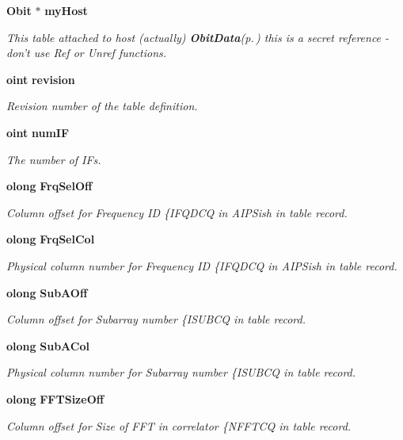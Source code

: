 \begin{CompactItemize}
{\bf Obit} $\ast$ {\bf my\-Host}
\begin{CompactList}\small\item\em This table attached to host (actually) {\bf Obit\-Data}{\rm (p.\,\pageref{structObitData})} this is a secret reference - don't use Ref or Unref functions. \item\end{CompactList}\item 
{\bf oint} {\bf revision}
\begin{CompactList}\small\item\em Revision number of the table definition. \item\end{CompactList}\item 
{\bf oint} {\bf num\-IF}
\begin{CompactList}\small\item\em The number of IFs. \item\end{CompactList}\item 
{\bf olong} {\bf Frq\-Sel\-Off}
\begin{CompactList}\small\item\em Column offset for Frequency ID \{IFQDCQ in AIPSish in table record. \item\end{CompactList}\item 
{\bf olong} {\bf Frq\-Sel\-Col}
\begin{CompactList}\small\item\em Physical column number for Frequency ID \{IFQDCQ in AIPSish in table record. \item\end{CompactList}\item 
{\bf olong} {\bf Sub\-AOff}
\begin{CompactList}\small\item\em Column offset for Subarray number \{ISUBCQ in table record. \item\end{CompactList}\item 
{\bf olong} {\bf Sub\-ACol}
\begin{CompactList}\small\item\em Physical column number for Subarray number \{ISUBCQ in table record. \item\end{CompactList}\item 
{\bf olong} {\bf FFTSize\-Off}
\begin{CompactList}\small\item\em Column offset for Size of FFT in correlator \{NFFTCQ in table record. \item\end{CompactList}\item 

\end{CompactItemize}
